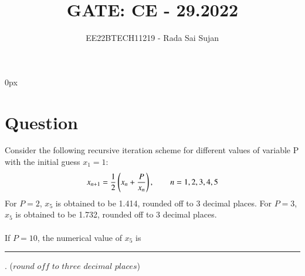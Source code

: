 \documentclass[journal,12pt,twocolumn]{IEEEtran}
\theoremstyle{remark}
\begin{document}
\parindent 0px

\title{GATE: CE - 29.2022}
\author{EE22BTECH11219 - Rada Sai Sujan$^{}$%
}
\maketitle
\newpage
\bigskip
\section*{Question}
Consider the following recursive iteration scheme for different values of variable P with the initial guess $x_1=1$:
$$x_{n+1}=\frac{1}{2}\left(x_n+\frac{P}{x_n}\right), \quad\quad n=1,2,3,4,5 $$
For $P=2$, $x_5$ is obtained to be 1.414, rounded off to 3 decimal places. For $P=3$, $x_5$ is obtained to be 1.732, rounded off to 3 decimal places.   \\ \\
If $P=10$, the numerical value of $x_5$ is \rule{1.3cm}{0.15mm} . ($round$ $off$ $to$ $three$ $decimal$ $places$)   \\
\solution 
\end{document}
